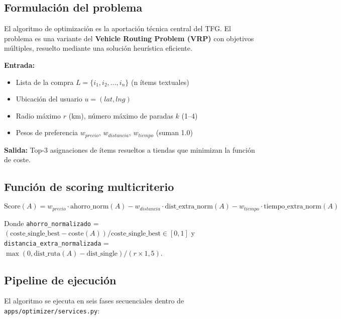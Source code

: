 \subsection{Formulaci\'on del problema}\label{subsec:formulacion}

El algoritmo de optimizaci\'on es la aportaci\'on t\'ecnica central del TFG. El problema es una
variante del \textbf{Vehicle Routing Problem (VRP)} con objetivos m\'ultiples, resuelto mediante
una soluci\'on heur\'istica eficiente.

\textbf{Entrada:}
\begin{itemize}
  \item Lista de la compra $L = \{i_1, i_2, \ldots, i_n\}$ (n \'items textuales)
  \item Ubicaci\'on del usuario $u = (lat, lng)$
  \item Radio m\'aximo $r$ (km), n\'umero m\'aximo de paradas $k$ (1--4)
  \item Pesos de preferencia $w_{precio}$, $w_{distancia}$, $w_{tiempo}$ (suman 1.0)
\end{itemize}

\textbf{Salida:} Top-3 asignaciones de \'items resueltos a tiendas que minimizan la funci\'on
de coste.

\subsection{Funci\'on de scoring multicriterio}\label{subsec:scoring}

\begin{equation}
  \text{Score}(A) = w_{precio} \cdot \text{ahorro\_norm}(A)
                 - w_{distancia} \cdot \text{dist\_extra\_norm}(A)
                 - w_{tiempo} \cdot \text{tiempo\_extra\_norm}(A)
\end{equation}

Donde \texttt{ahorro\_normalizado} = $(\text{coste\_single\_best} - \text{coste}(A)) /
\text{coste\_single\_best} \in [0, 1]$ y \texttt{distancia\_extra\_normalizada} = $\max(0,
\text{dist\_ruta}(A) - \text{dist\_single}) / (r \times 1{,}5)$.

\subsection{Pipeline de ejecuci\'on}\label{subsec:pipeline}

El algoritmo se ejecuta en seis fases secuenciales dentro de
\texttt{apps/optimizer/services.py}:

